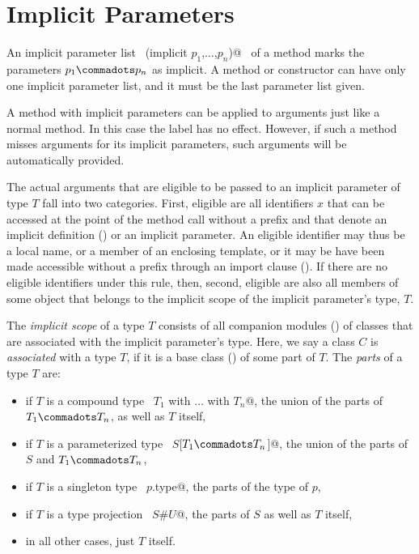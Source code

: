 \section{Implicit Parameters}\label{sec:impl-params}

An implicit parameter list
~\lstinline@(implicit $p_1$,$\ldots$,$p_n$)@~ of a method marks the parameters $p_1 \commadots p_n$ as
implicit. A method or constructor can have only one implicit parameter
list, and it must be the last parameter list given.

A method with implicit parameters can be applied to arguments just
like a normal method. In this case the  label has no
effect. However, if such a method misses arguments for its implicit
parameters, such arguments will be automatically provided.

The actual arguments that are eligible to be passed to an implicit
parameter of type $T$ fall into two categories. First, eligible are
all identifiers $x$ that can be accessed at the point of the method
call without a prefix and that denote an implicit definition
() or an implicit parameter.  An eligible
identifier may thus be a local name, or a member of an enclosing
template, or it may be have been made accessible without a prefix
through an import clause (). If there are no eligible
identifiers under this rule, then, second, eligible are also all
 members of some object that belongs to the implicit
scope of the implicit parameter's type, $T$.

The {\em implicit scope} of a type $T$ consists of all companion modules
() of classes that are associated with the
implicit parameter's type.  Here, we say a class $C$ is {\em
associated} with a type $T$, if it is a base class
() of some part of $T$.  The {\em parts} of a
type $T$ are:
\begin{itemize}
\item
if $T$ is a compound type ~\lstinline@$T_1$ with $\ldots$ with $T_n$@, the
union of the parts of $T_1 \commadots T_n$, as well as $T$ itself,
\item
if $T$ is a parameterized type ~\lstinline@$S$[$T_1 \commadots T_n$]@, 
the union of the parts of $S$ and $T_1 \commadots T_n$,
\item
if $T$ is a singleton type ~\lstinline@$p$.type@, the parts of the type
of $p$,
\item
if $T$ is a type projection ~\lstinline@$S$#$U$@, the parts of $S$ as
well as $T$ itself,
\item
in all other cases, just $T$ itself.
\end{itemize}


